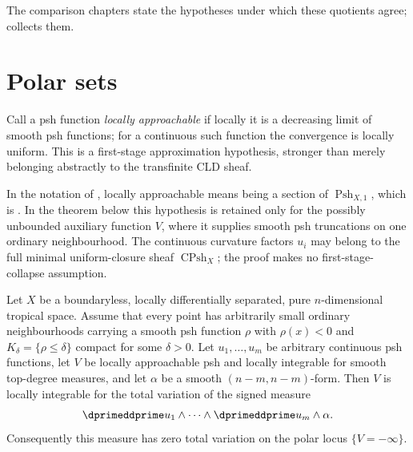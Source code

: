 The comparison chapters state the hypotheses under which these quotients
agree;  collects them.

\section{Polar sets}
\label{sec:ch16-polar}

Call a psh function \emph{locally approachable} if locally it is a decreasing
limit of smooth psh functions; for a continuous such function the convergence
is locally uniform.  This is a first-stage approximation hypothesis, stronger
than merely belonging abstractly to the transfinite CLD sheaf.

In the notation of , locally approachable means
being a section of $\operatorname{Psh}_{X,1}$, which is
\cite[Definition~8.1.13]{CLD25}.  In the theorem below this hypothesis is
retained only for the possibly unbounded auxiliary function $V$, where it
supplies smooth psh truncations on one ordinary neighbourhood.  The
continuous curvature factors $u_i$ may belong to the full minimal
uniform-closure sheaf $\operatorname{CPsh}_X$; the proof makes no
first-stage-collapse assumption.

\begin{theorem}
\label{thm:cld-polar-negligibility}
Let $X$ be a boundaryless, locally differentially separated, pure
$n$-dimensional tropical space.  Assume that every point has arbitrarily
small ordinary neighbourhoods carrying a smooth psh function $\rho$ with
$\rho(x)<0$ and $K_\delta=\{\rho\leq\delta\}$ compact for some
$\delta>0$.  Let $u_1,\ldots,u_m$ be arbitrary continuous psh functions,
let $V$ be locally approachable psh and locally integrable for smooth
top-degree measures, and let $\alpha$ be a smooth
$(n-m,n-m)$-form.  Then $V$ is locally integrable for the total variation of
the signed measure
\[
          \dprimeddprime u_1\wedge\cdots\wedge
          \dprimeddprime u_m\wedge\alpha.
\]
Consequently this measure has zero total variation on the polar locus
$\{V=-\infty\}$.
\end{theorem}

